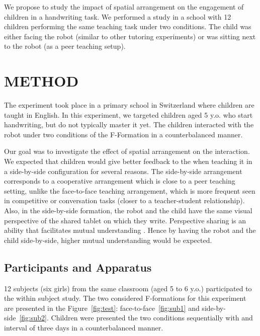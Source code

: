 \documentclass[letterpaper, 10 pt, conference]{ieeeconf}  %
\begin{document}
We propose to study the impact of spatial arrangement on the engagement of children in a handwriting task.
We performed a study in a school with 12 children performing the same teaching task under two conditions.
The child was either facing the robot (similar to other tutoring experiments) or was sitting next to the robot (as a peer teaching setup).


\section{METHOD}
The experiment took place in a primary school in Switzerland where children are taught in English.
In this experiment, we targeted children aged 5 y.o. who start handwriting, but do not typically master it yet.
The children interacted with the robot under two conditions of the F-Formation in a counterbalanced manner.

Our goal was to investigate the effect of spatial arrangement on the interaction.
We expected that children would give better feedback to the
when teaching it in a side-by-side configuration for several reasons.
The side-by-side arrangement corresponds to a cooperative arrangement which is close to a peer teaching setting, unlike the face-to-face teaching arrangement, which is more frequent seen in competitive or conversation tasks (closer to a teacher-student relationship).
Also, in the side-by-side formation, the robot and the child have the same visual perspective of the shared tablet on which they write.
Perspective sharing is an ability that facilitates mutual understanding \cite{berlin2006perspective}.
Hence by having the robot and the child side-by-side, higher mutual understanding would be expected.

\subsection{Participants and Apparatus}
12 subjects (six girls) from the same classroom (aged 5 to 6 y.o.) participated to the within subject study.
The two considered F-formations for this experiment are presented in the Figure~\ref{fig:test}: face-to-face~\ref{fig:sub1} and side-by-side~\ref{fig:sub2}.
Children were presented the two conditions sequentially with and interval of three days in a counterbalanced manner.
\end{document}

